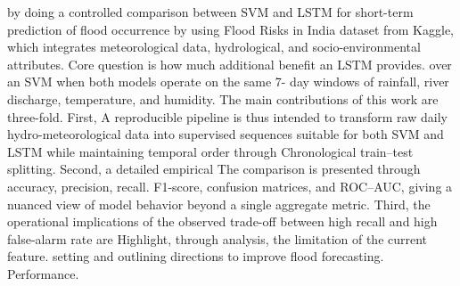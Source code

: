 \documentclass[conference]{IEEEtran}
\begin{document}
by doing a controlled comparison between SVM and LSTM for
short-term prediction of flood occurrence by using Flood Risks in
India dataset from Kaggle, which integrates meteorological data,
hydrological, and socio-environmental attributes. Core
question is how much additional benefit an LSTM provides.
over an SVM when both models operate on the same 7-
day windows of rainfall, river discharge, temperature, and
humidity.
The main contributions of this work are three-fold. First,
A reproducible pipeline is thus intended to transform raw daily
hydro-meteorological data into supervised sequences suitable
for both SVM and LSTM while maintaining temporal order through
Chronological train–test splitting. Second, a detailed empirical
The comparison is presented through accuracy, precision, recall.
F1-score, confusion matrices, and ROC–AUC, giving a
nuanced view of model behavior beyond a single aggregate
metric. Third, the operational implications of the observed
trade-off between high recall and high false-alarm rate are
Highlight, through analysis, the limitation of the current feature.
setting and outlining directions to improve flood forecasting.
Performance. 
\end{document}
